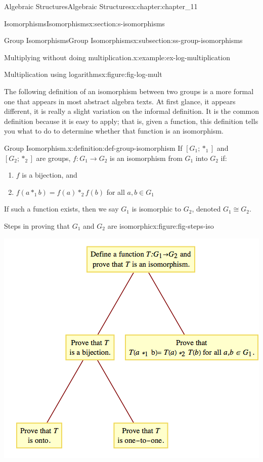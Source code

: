 \documentclass[oneside,10pt,]{book}
\numberwithin{equation}{section}
\begin{document}
\begin{chapterptx}{Algebraic Structures}{}{Algebraic Structures}{}{}{x:chapter:chapter_11}
\begin{sectionptx}{Isomorphisms}{}{Isomorphisms}{}{}{x:section:s-isomorphisms}
\begin{subsectionptx}{Group Isomorphisms}{}{Group Isomorphisms}{}{}{x:subsection:ss-group-isomorphisms}
\begin{example}{Multiplying without doing multiplication.}{x:example:ex-log-multiplication}
\begin{figureptx}{Multiplication using logarithms}{x:figure:fig-log-mult}{}
\begin{image}{0.15}{0.7}{0.15}
\end{image}%
\tcblower
\end{figureptx}%
\end{example}
The following definition of an isomorphism between two groups is a more formal one that appears in most abstract algebra texts. At first glance, it appears different, it is really a slight variation on the informal definition. It is the common definition because it is easy to apply; that is, given a function, this definition tells you what to do to determine whether that function is an isomorphism.%
\begin{definition}{Group Isomorphism.}{x:definition:def-group-isomorphism}%
%
\label{g:notation:idm546595399696}%
If \(\left[G_1 ; *_1\right]\) and \(\left[G_2 ; *_2\right]\) are groups, \(f: G_1 \to G_2\) is an isomorphism from \(G_1\) into \(G_2\) if:%
\begin{enumerate}[label=(\arabic*)]
\item{}\(f\) is a bijection, and%
\item{}\(f\left(a *_1 b\right) = f(a) *_2f(b)\)   for all \(a, b\in  G_1\)%
\end{enumerate}
%
\par
If such a function exists, then we say \(G_1\) is isomorphic to \(G_2\), denoted \(G_1 \cong G_2\).%
\end{definition}
\begin{figureptx}{Steps in proving that \(G_1\) and \(G_2\) are isomorphic}{x:figure:fig-steps-iso}{}%
\begin{image}{0.2}{0.6}{0.2}%
\includegraphics[width=\linewidth]{images/fig-steps-iso.png}

\end{image}
\end{figureptx}
\end{subsectionptx}
\end{sectionptx}
\end{chapterptx}
\end{document}
